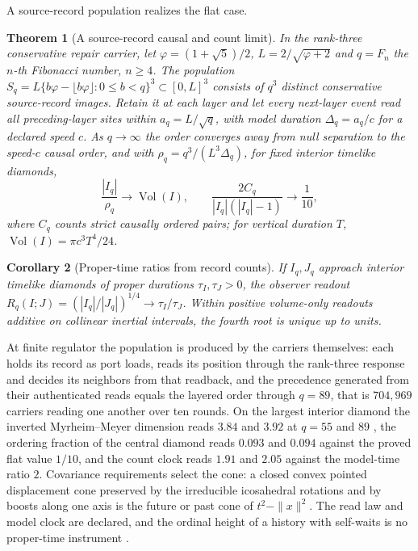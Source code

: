 \documentclass[11pt]{article}
\newtheorem{theorem}{Theorem}[section]
\newtheorem{corollary}[theorem]{Corollary}
\theoremstyle{definition}
\theoremstyle{remark}
\begin{document}
A source-record population realizes the flat case.

\begin{theorem}[A source-record causal and count limit]
\label{thm:source-record-causal-count}
In the rank-three conservative repair carrier, let
$\varphi=(1+\sqrt5)/2$, $L=2/\sqrt{\varphi+2}$ and $q=F_n$ the $n$-th Fibonacci number, $n\geq4$. The
population
$S_q=L\{b\varphi-\lfloor b\varphi\rfloor:0\leq b<q\}^{3}\subset[0,L]^3$
consists of $q^3$ distinct conservative source-record images. Retain it at
each layer and let every next-layer event read all preceding-layer sites
within $a_q=L/\sqrt q$, with model duration $\Delta_q=a_q/c$ for a declared speed $c$. As
$q\to\infty$ the order converges away from null separation to the speed-$c$
causal order, and with $\rho_q=q^3/(L^3\Delta_q)$, for fixed interior
timelike diamonds,
\[
 \frac{|I_q|}{\rho_q}\longrightarrow\operatorname{Vol}(I),
 \qquad
 \frac{2C_q}{|I_q|(|I_q|-1)}\longrightarrow\frac1{10},
\]
where $C_q$ counts strict causally ordered pairs; for vertical duration $T$,
$\operatorname{Vol}(I)=\pi c^3T^4/24$.
\end{theorem}

\begin{corollary}[Proper-time ratios from record counts]
\label{cor:count-clock}
If $I_q,J_q$ approach interior timelike diamonds of proper durations
$\tau_I,\tau_J>0$, the observer readout
$R_q(I;J)=(|I_q|/|J_q|)^{1/4}\to\tau_I/\tau_J$. Within positive volume-only
readouts additive on collinear inertial intervals, the fourth root is unique
up to units.
\end{corollary}

At finite regulator the population is produced by the carriers themselves:
each holds its record as port loads, reads its position through the
rank-three response and decides its neighbors from that readback, and the
precedence generated from their authenticated reads equals the layered order
through $q=89$, that is $704{,}969$ carriers reading one another over ten
rounds. On the largest interior diamond the inverted Myrheim--Meyer
dimension reads $3.84$ and $3.92$ at $q=55$ and $89$
\cite{myrheim1978,meyer1988}, the ordering fraction of the central diamond
reads $0.093$ and $0.094$ against the proved flat value $1/10$, and the
count clock reads $1.91$ and $2.05$ against the model-time ratio $2$.
Covariance requirements
select the cone: a closed convex pointed displacement cone preserved by the
irreducible icosahedral rotations and by boosts along one axis is the future
or past cone of $t^2-\|x\|^2$. The read law and model clock are declared, and
the ordinal height of a history with self-waits is no proper-time instrument
\cite{ophEinstein}.
\end{document}
